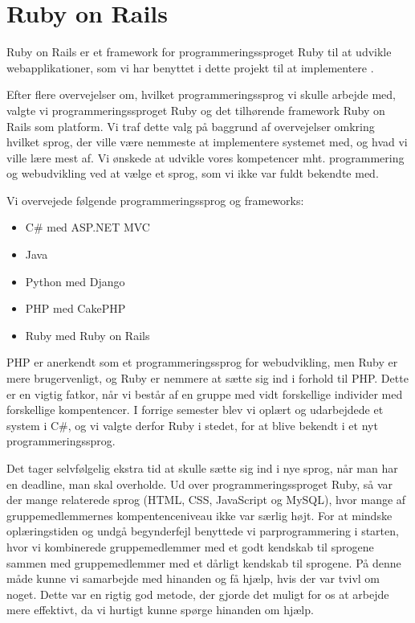 \chapter{Ruby on Rails}
\label{akademiskror}

Ruby on Rails er et framework for programmeringssproget Ruby til at udvikle webapplikationer, som vi har benyttet i dette projekt til at implementere {\Foodl}.

Efter flere overvejelser om, hvilket programmeringssprog vi skulle arbejde med, valgte vi programmeringssproget Ruby og det tilhørende framework Ruby on Rails som platform. Vi traf dette valg på baggrund af overvejelser omkring hvilket sprog, der ville være nemmeste at implementere systemet med, og hvad vi ville lære mest af. Vi ønskede at udvikle vores kompetencer mht. programmering og webudvikling ved at vælge et sprog, som vi ikke var fuldt bekendte med. 

Vi overvejede følgende programmeringssprog og frameworks:

\begin{itemize}[noitemsep]
\item C\# med ASP.NET MVC
\item Java
\item Python med Django
\item PHP med CakePHP
\item Ruby med Ruby on Rails
\end{itemize}

PHP er anerkendt som et programmeringssprog for webudvikling, men Ruby er mere brugervenligt, og Ruby er nemmere at sætte sig ind i forhold til PHP. Dette er en vigtig fatkor, når vi består af en gruppe med vidt forskellige individer med forskellige kompentencer. I forrige semester blev vi oplært og udarbejdede et system i C\#, og vi valgte derfor Ruby i stedet, for at blive bekendt i et nyt programmeringssprog.

Det tager selvfølgelig ekstra tid at skulle sætte sig ind i nye sprog, når man har en deadline, man skal overholde. Ud over programmeringssproget Ruby, så var der mange relaterede sprog (HTML, CSS, JavaScript og MySQL), hvor mange af gruppemedlemmernes kompentenceniveau ikke var særlig højt. For at mindske oplæringstiden og undgå begynderfejl benyttede vi parprogrammering i starten, hvor vi kombinerede gruppemedlemmer med et godt kendskab til sprogene sammen med gruppemedlemmer med et dårligt kendskab til sprogene. På denne måde kunne vi samarbejde med hinanden og få hjælp, hvis der var tvivl om noget. Dette var en rigtig god metode, der gjorde det muligt for os at arbejde mere effektivt, da vi hurtigt kunne spørge hinanden om hjælp.

